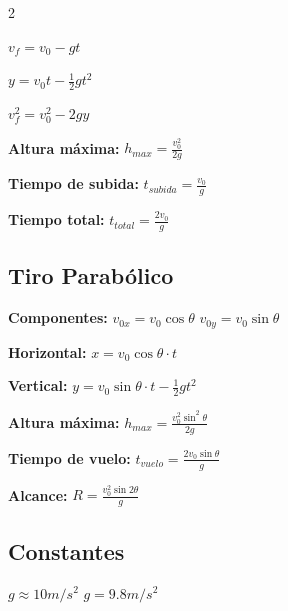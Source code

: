 \begin{multicols}{2}
\begin{ecuacion}
$v_f = v_0 - gt$

$y = v_0 t - \frac{1}{2}gt^2$

$v_f^2 = v_0^2 - 2gy$

\textbf{Altura máxima:}
$h_{max} = \frac{v_0^2}{2g}$

\textbf{Tiempo de subida:}
$t_{subida} = \frac{v_0}{g}$

\textbf{Tiempo total:}
$t_{total} = \frac{2v_0}{g}$
\end{ecuacion}

\subsection{Tiro Parabólico}

\begin{ecuacion}
\textbf{Componentes:}
$v_{0x} = v_0 \cos \theta$
$v_{0y} = v_0 \sin \theta$

\textbf{Horizontal:}
$x = v_0 \cos \theta \cdot t$

\textbf{Vertical:}
$y = v_0 \sin \theta \cdot t - \frac{1}{2}gt^2$

\textbf{Altura máxima:}
$h_{max} = \frac{v_0^2 \sin^2 \theta}{2g}$

\textbf{Tiempo de vuelo:}
$t_{vuelo} = \frac{2v_0 \sin \theta}{g}$

\textbf{Alcance:}
$R = \frac{v_0^2 \sin 2\theta}{g}$


\end{ecuacion}

\subsection{Constantes}

\begin{ecuacion}
$g \approx 10 m/s^2$
$g = 9.8 m/s^2$
\end{ecuacion}

\end{multicols}
